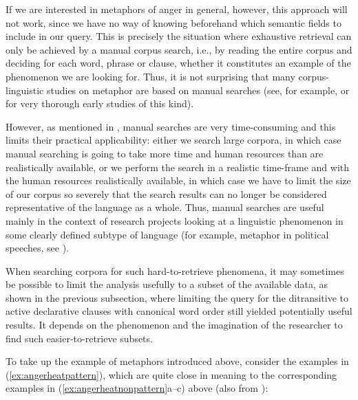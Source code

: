 If we are interested in metaphors  of anger  in general, however, this approach will not work, since we have no way of knowing beforehand which semantic  fields to include in our query.  This is precisely the situation where exhaustive retrieval  can only be achieved by a manual  corpus search, i.e., by reading the entire corpus and deciding for each word, phrase or clause, whether it constitutes an example of the phenomenon we are looking for. Thus, it is not surprising that many corpus\hyp{}linguistic studies on metaphor  are based on manual searches (see, for example, \citet{semino_politics_1996} or \citet{jakel_metaphern_1997} for very thorough early studies of this kind).

However, as mentioned in , manual  searches are very time\hyp{}consuming and this limits their practical applicability: either we search large  corpora, in which case manual searching is going to take more time and human resources than are realistically available, or we perform the search in a realistic time\hyp{}frame and with the human resources realistically available, in which case we have to limit the size  of our corpus so severely that the search results can no longer be considered representative  of the language as a whole. Thus, manual  searches are useful mainly in the context of research projects looking at a linguistic phenomenon in some clearly defined subtype of language (for example, metaphor  in political speeches, see \citealt{charteris-black_politicians_2005}).

When searching corpora for such hard\hyp{}to\hyp{}retrieve  phenomena, it may sometimes be possible to limit the analysis usefully to a subset of the available data, as shown in the previous subsection, where limiting the query  for the ditransitive  to active declarative clauses with canonical word order  still yielded potentially useful results. It depends on the phenomenon and the imagination of the researcher to find such easier\hyp{}to\hyp{}retrieve subsets.

To take up the example of metaphors  introduced above, consider the examples in (\ref{ex:angerheatpattern}),  which are quite close in meaning to the corresponding examples in (\ref{ex:angerheatnonpattern}a--c) above (also from \citealt[189, 203]{lakoff_cognitive_1987}):

